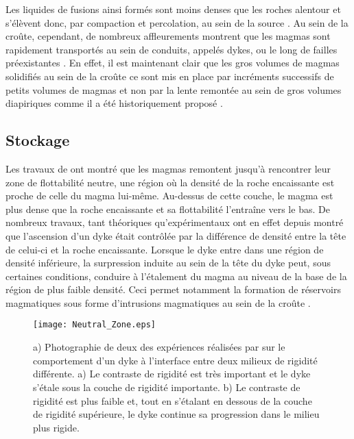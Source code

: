 Les liquides de fusions ainsi formés sont moins denses que les roches
alentour et s'élèvent donc, par compaction et percolation, au sein de
la source \citep{McKenzy:1984bo,McKenzie:1985jq}. Au sein de la
croûte, cependant, de nombreux affleurements montrent que les magmas
sont rapidement transportés au sein de conduits, appelés dykes, ou le
long de failles préexistantes
\citep{Clemens:1992kr,Petford:1993bk,Rubin:1995upa,Glazner:2004gv}. En
effet, il est maintenant clair que les gros volumes de magmas
solidifiés au sein de la croûte ce sont mis en place par incréments
successifs de petits volumes de magmas
\citep{Annen:2002er,Glazner:2004gv,Michaut:2011kg} et non par la lente
remontée au sein de gros volumes diapiriques comme il a été
historiquement proposé \citep{Miller:1999km}.


\subsection{Stockage}
\label{C1-sec:stockage}

Les  travaux  de  \citet{Walker:1989jq}  ont  montré  que  les  magmas
remontent  jusqu'à rencontrer  leur zone  de flottabilité  neutre, une
région où  la densité de la  roche encaissante est proche  de celle du
magma lui-même. Au-dessus de cette couche, le magma est plus dense que
la roche  encaissante et  sa flottabilité l'entraîne  vers le  bas. De
nombreux             travaux,              tant             théoriques
\citep{Lister:1991ut,Petford:1993bk,Rubin:1995upa}    qu'expérimentaux
\citep{Taisne:2009kj,Taisne:2011do}  ont en  effet  depuis montré  que
l'ascension d'un  dyke était  contrôlée par  la différence  de densité
entre la  tête de celui-ci  et la  roche encaissante. Lorsque  le dyke
entre dans une région de densité inférieure, la surpression induite au
sein de  la tête du dyke  peut, sous certaines conditions,  conduire à
l'étalement du magma au niveau de la  base de la région de plus faible
densité. Ceci permet notamment  la formation de réservoirs magmatiques
sous   forme   d'intrusions  magmatiques   au   sein   de  la   croûte
\citep{Taisne:2011do}.
\begin{figure}[h!]
 \begin{center}
 \graphicspath{ {/Users/thorey/Documents/These/Manuscript/Figure/Chapter1/} }
 \texttt{[image: Neutral\_Zone.eps]}
 \caption{a) Photographie de deux des expériences réalisées par
 \citet{Kavanagh:2006ig} sur le comportement d'un dyke à
 l'interface entre deux milieux de rigidité différente. a) Le
 contraste de rigidité est très important et le dyke s'étale sous
 la couche de rigidité importante. b) Le contraste de rigidité
 est plus faible et, tout en s'étalant en dessous de la couche de
 rigidité supérieure, le dyke continue sa progression dans le
 milieu plus rigide.}
 \label{C1-Neutral_Zone}
 \end{center}
\end{figure}

